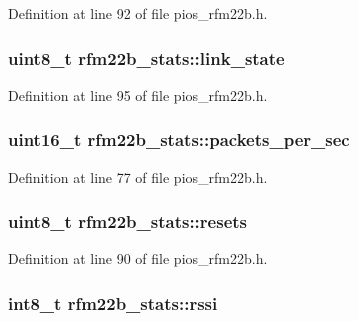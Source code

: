 \-Definition at line 92 of file pios\-\_\-rfm22b.\-h.

\hypertarget{structrfm22b__stats_aff1fd3341c07dab52a2a666cb6d7ddd4}{
\subsubsection[{link\-\_\-state}]{\setlength{\rightskip}{0pt plus 5cm}uint8\-\_\-t {\bf rfm22b\-\_\-stats\-::link\-\_\-state}}}\label{structrfm22b__stats_aff1fd3341c07dab52a2a666cb6d7ddd4}


\-Definition at line 95 of file pios\-\_\-rfm22b.\-h.

\hypertarget{structrfm22b__stats_a9ed3bba20847dcee3b0397c210b22d3d}{
\subsubsection[{packets\-\_\-per\-\_\-sec}]{\setlength{\rightskip}{0pt plus 5cm}uint16\-\_\-t {\bf rfm22b\-\_\-stats\-::packets\-\_\-per\-\_\-sec}}}\label{structrfm22b__stats_a9ed3bba20847dcee3b0397c210b22d3d}


\-Definition at line 77 of file pios\-\_\-rfm22b.\-h.

\hypertarget{structrfm22b__stats_a8d5014c62b137509e9a5a51fe9e1acae}{
\subsubsection[{resets}]{\setlength{\rightskip}{0pt plus 5cm}uint8\-\_\-t {\bf rfm22b\-\_\-stats\-::resets}}}\label{structrfm22b__stats_a8d5014c62b137509e9a5a51fe9e1acae}


\-Definition at line 90 of file pios\-\_\-rfm22b.\-h.

\hypertarget{structrfm22b__stats_af292c65ed2be928fd2c5e4639c2cf025}{
\subsubsection[{rssi}]{\setlength{\rightskip}{0pt plus 5cm}int8\-\_\-t {\bf rfm22b\-\_\-stats\-::rssi}}}\label{structrfm22b__stats_af292c65ed2be928fd2c5e4639c2cf025}


